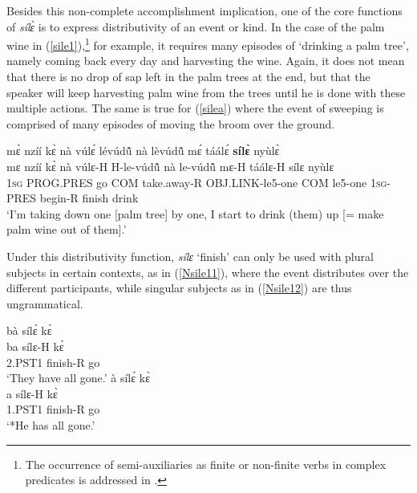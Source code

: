 Besides this non-complete accomplishment implication, one of  the core functions of {\itshape sílɛ̀} is to express distributivity of an event or kind. In the case of the palm wine in (\ref{sile1}),\footnote{The occurrence of semi-auxiliaries as finite or non-finite verbs in complex predicates is addressed in .} for example, it requires many episodes of `drinking a palm tree', namely coming back every day and harvesting the wine. Again, it does not mean that there is no drop of sap left in the palm trees at the end, but that the speaker will keep harvesting palm wine from the trees until he is done with these multiple actions. The same is true for (\ref{silea}) where the event of sweeping is comprised of many episodes of moving the broom over the ground.

\begin{exe} 
\ex\label{sile1}
  \glll   mɛ̀ nzíí kɛ̀ nà vúlɛ́ lévúdũ̂ nà lèvúdũ̂ mɛ́ táálɛ́ {\bfseries sílɛ̀} nyùlɛ̀ \\
          mɛ nzíí kɛ̀ nà vúlɛ-H H-le-vúdũ̂ nà le-vúdũ̂ mɛ-H táálɛ-H sílɛ nyùlɛ \\
           1\textsc{sg} PROG.PRES go COM take.away-R OBJ.LINK-le5-one COM le5-one 1\textsc{sg}-PRES begin-R finish drink \\
    \trans `I'm taking down one [palm tree] by one, I start to drink (them) up [= make palm wine out of them].'
\end{exe}

Under this distributivity function, {\itshape sílɛ} `finish' can only be used with plural subjects in certain contexts, as in (\ref{Nsile11}), where the event distributes over the different participants, while singular subjects as in (\ref{Nsile12}) are thus ungrammatical.


\begin{exe}
\ex\label{Nsile1}
\begin{xlist}
\ex \label{Nsile11}
  \glll  bà sílɛ́ kɛ̀ \\
          ba sílɛ-H kɛ̀ \\
         2.PST1 finish-R go  \\
    \trans `They have all gone.'
\ex\label{Nsile12}
  \glll   *à sílɛ́ kɛ̀ \\
           a sílɛ-H kɛ̀\\
          1.PST1 finish-R go \\
    \trans `*He has all gone.'
\end{xlist}
\end{exe}

